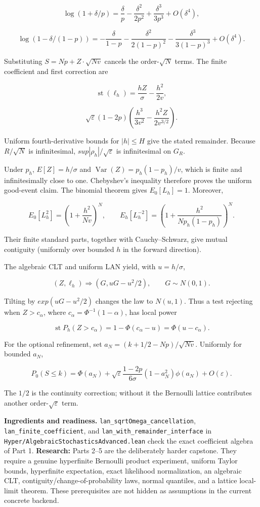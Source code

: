\documentclass[11pt]{article}
\newcommand{\eps}{\varepsilon}
\renewcommand{\epsilon}{\varepsilon}
\newcommand{\Var}{\operatorname{Var}}
\begin{document}
\[
\log(1+\delta/p)=\frac\delta p-\frac{\delta^2}{2p^2}
 +\frac{\delta^3}{3p^3}+O(\delta^4),
\]

\[
\log(1-\delta/(1-p))=-\frac\delta{1-p}
 -\frac{\delta^2}{2(1-p)^2}-\frac{\delta^3}{3(1-p)^3}
 +O(\delta^4).
\]

Substituting $S=Np+Z\cdot \sqrt{Nv}$ cancels the order-$\sqrt{N}$ terms. The finite
coefficient and first correction are

\[
\operatorname{st}(\ell_h)=\frac{hZ}{\sigma}-\frac{h^2}{2v},
\]

\[
\sqrt\epsilon(1-2p)
\left(\frac{h^3}{3v^2}-\frac{h^2Z}{2v^{3/2}}\right).
\]

Uniform fourth-derivative bounds for $|h|\le H$ give the stated remainder.
Because $R/\sqrt{N}$ is infinitesimal,
$sup |\rho_h|/\sqrt{\eps}$ is infinitesimal on $G_{R}$.

Under $p_{h}$, $E[Z]=h/\sigma$ and
$\Var(Z)=p_h(1-p_h)/v$, which is finite and infinitesimally close to one.
Chebyshev's inequality therefore proves the uniform good-event claim. The
binomial theorem gives $E_0[L_h]=1$. Moreover,

\[
E_0[L_h^2]=\left(1+\frac{h^2}{Nv}\right)^N,
\qquad
E_h[L_h^{-2}]=\left(1+\frac{h^2}{N p_h(1-p_h)}\right)^N.
\]

Their finite standard parts, together with Cauchy--Schwarz, give mutual
contiguity (uniformly over bounded $h$ in the forward direction).

The algebraic CLT and uniform LAN yield, with $u=h/\sigma$,

\[
(Z,\ell_h)\Longrightarrow(G,uG-u^2/2),\qquad G\sim N(0,1).
\]

Tilting by $exp(uG-u^2/2)$ changes the law to $N(u,1)$. Thus a test rejecting
when $Z>c_\alpha$, where $c_\alpha=\Phi^{-1}(1-\alpha)$, has local power

\[
\operatorname{st}P_h(Z>c_\alpha)
=1-\Phi(c_\alpha-u)=\Phi(u-c_\alpha).
\]

For the optional refinement, set
$a_N=(k+1/2-Np)/\sqrt{Nv}$. Uniformly for bounded $a_{N}$,

\[
P_0(S\le k)=\Phi(a_N)
+\sqrt\epsilon\frac{1-2p}{6\sigma}(1-a_N^2)\phi(a_N)
+O(\epsilon).
\]

The $1/2$ is the continuity correction; without it the Bernoulli lattice
contributes another order-$\sqrt{\eps}$ term.

\textbf{Ingredients and readiness.} \texttt{lan\_sqrtOmega\_cancellation},
\texttt{lan\_finite\_coefficient}, and \texttt{lan\_with\_remainder\_interface} in
\texttt{Hyper/AlgebraicStochasticsAdvanced.lean} check the exact coefficient algebra
of Part 1. \textbf{Research:} Parts 2--5 are the deliberately harder capstone. They
require a genuine hyperfinite Bernoulli product experiment, uniform Taylor
bounds, hyperfinite expectation, exact likelihood normalization, an algebraic
CLT, contiguity/change-of-probability laws, normal quantiles, and a lattice
local-limit theorem. These prerequisites are not hidden as assumptions in the
current concrete backend.
\end{document}
